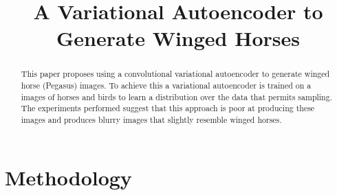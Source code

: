 \documentclass{article}
\title{A Variational Autoencoder to Generate Winged Horses}
\begin{document}
\maketitle
\begin{abstract}
    This paper proposes using a convolutional variational autoencoder to generate winged horse (Pegasus) images. To achieve this a variational autoencoder is trained on a images of horses and birds to learn a distribution over the data that permits sampling. The experiments performed suggest that this approach is poor at producing these images and produces blurry images that slightly resemble winged horses.
\end{abstract}
\section{Methodology}
\end{document}
